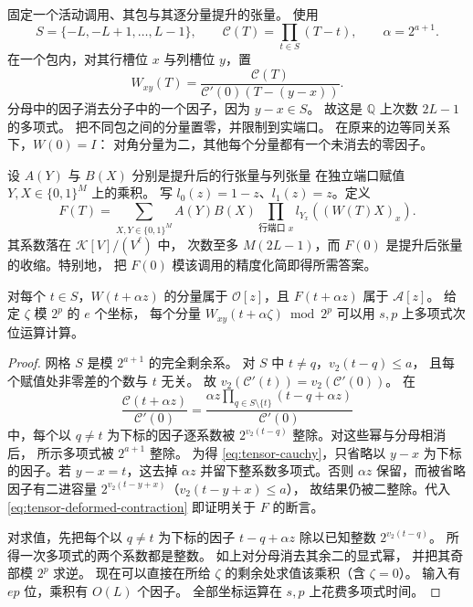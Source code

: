 固定一个活动调用、其包与其逐分量提升的张量。
使用
\[
 S=\{-L,-L+1,\ldots,L-1\},\qquad
 \mathcal C(T)=\prod_{t\in S}(T-t),\qquad \alpha=2^{a+1}.
\]
在一个包内，对其行槽位 $x$ 与列槽位 $y$，置
\begin{equation}\label{eq:tensor-cauchy}
 W_{xy}(T)=\frac{\mathcal C(T)}
                  {\mathcal C'(0)(T-(y-x))}.
\end{equation}
分母中的因子消去分子中的一个因子，因为 $y-x\in S$。
故这是 $\mathbb Q$ 上次数 $2L-1$ 的多项式。
把不同包之间的分量置零，并限制到实端口。
在原来的边等同关系下，$W(0)=I$：
对角分量为二，其他每个分量都有一个未消去的零因子。

设 $A(Y)$ 与 $B(X)$ 分别是提升后的行张量与列张量
在独立端口赋值 $Y,X\in\{0,1\}^M$ 上的乘积。
写 $l_0(z)=1-z$、$l_1(z)=z$。定义
\begin{equation}\label{eq:tensor-deformed-contraction}
 F(T)=\sum_{X,Y\in\{0,1\}^M} A(Y)B(X)
                  \prod_{\text{行端口 }x}l_{Y_x}((W(T)X)_x).
\end{equation}
其系数落在 $\mathcal K[V]/(V^\ell)$ 中，
次数至多 $M(2L-1)$，而 $F(0)$
是提升后张量的收缩。特别地，
把 $F(0)$ 模该调用的精度化简即得所需答案。

\begin{lemma}\label{lem:tensor-integrality}
对每个 $t\in S$，$W(t+\alpha z)$ 的分量属于
$\mathcal O[z]$，且 $F(t+\alpha z)$ 属于
$\mathcal A[z]$。
给定 $\zeta$ 模 $2^p$ 的 $e$ 个坐标，
每个分量 $W_{xy}(t+\alpha\zeta)\bmod 2^p$
可以用 $s,p$ 上多项式次位运算计算。
\end{lemma}
\begin{proof}
网格 $S$ 是模 $2^{a+1}$ 的完全剩余系。
对 $S$ 中 $t\ne q$，$v_2(t-q)\le a$，
且每个赋值处非零差的个数与 $t$ 无关。
故 $v_2(\mathcal C'(t))=v_2(\mathcal C'(0))$。
在
\[
 \frac{\mathcal C(t+\alpha z)}{\mathcal C'(0)}
  =\frac{\alpha z\prod_{q\in S\setminus\{t\}}
                         (t-q+\alpha z)}{\mathcal C'(0)}
\]
中，每个以 $q\ne t$ 为下标的因子逐系数被
$2^{v_2(t-q)}$ 整除。对这些幂与分母相消后，
所示多项式被 $2^{a+1}$ 整除。
为得 \eqref{eq:tensor-cauchy}，只省略以 $y-x$
为下标的因子。若 $y-x=t$，这去掉 $\alpha z$
并留下整系数多项式。否则 $\alpha z$
保留，而被省略因子有二进容量
$2^{v_2(t-y+x)}$（$v_2(t-y+x)\le a$），
故结果仍被二整除。代入
\eqref{eq:tensor-deformed-contraction}
即证明关于 $F$ 的断言。

对求值，先把每个以 $q\ne t$ 为下标的因子
$t-q+\alpha z$ 除以已知整数 $2^{v_2(t-q)}$。
所得一次多项式的两个系数都是整数。
如上对分母消去其余二的显式幂，
并把其奇部模 $2^p$ 求逆。
现在可以直接在所给 $\zeta$
的剩余处求值该乘积（含 $\zeta=0$）。
输入有 $ep$ 位，乘积有 $O(L)$ 个因子。
全部坐标运算在 $s,p$ 上花费多项式时间。
\end{proof}

